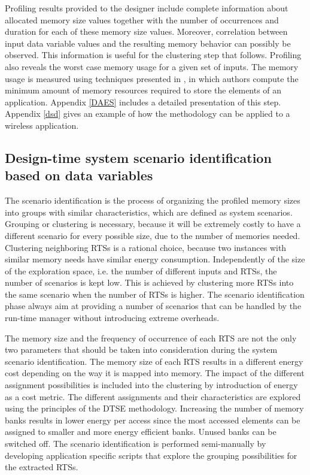 Profiling results provided to the designer include complete information about allocated memory size values together with the number of occurrences and duration for each of these memory size values. 
Moreover, correlation between input data variable values and the resulting memory behavior can possibly be observed. 
This information is useful for the clustering step that follows. 
Profiling also reveals the worst case memory usage for a given set of inputs. 
The memory usage is measured using techniques presented in \cite{Ang13b}, in which authors compute the minimum amount of memory resources required to store the elements of an application. 
Appendix \ref{DAES} includes a detailed presentation of this step. Appendix \ref{dsd} gives an example of how the methodology can be applied to a wireless application.

\subsection{Design-time system scenario identification based on data variables}

The scenario identification is the process of organizing the profiled memory sizes into groups with similar characteristics, which are defined as system scenarios. 
Grouping or clustering is necessary, because it will be extremely costly to have a different scenario for every possible size, due to the number of memories needed. 
Clustering neighboring RTSs is a rational choice, because two instances with similar memory needs have similar energy consumption. 
Independently of the size of the exploration space, i.e. the number of different inputs and RTSs, the number of scenarios is kept low.
This is achieved by clustering more RTSs into the same scenario when the number of RTSs is higher.
The scenario identification phase always aim at providing a number of scenarios that can be handled by the run-time manager without introducing extreme overheads. 

The memory size and the frequency of occurrence of each RTS are not the only two parameters that should be taken into consideration during the system scenario identification. 
The memory size of each RTS results in a different energy cost depending on the way it is mapped into memory. 
The impact of the different assignment possibilities is included into the clustering by introduction of energy as a cost metric. 
The different assignments and their characteristics are explored using the principles of the DTSE methodology.
Increasing the number of memory banks results in lower energy per access since the most accessed elements can be assigned to smaller and more energy efficient banks. 
Unused banks can be switched off.
The scenario identification is performed semi-manually by developing application specific scripts that explore the grouping possibilities for the extracted RTSs.

